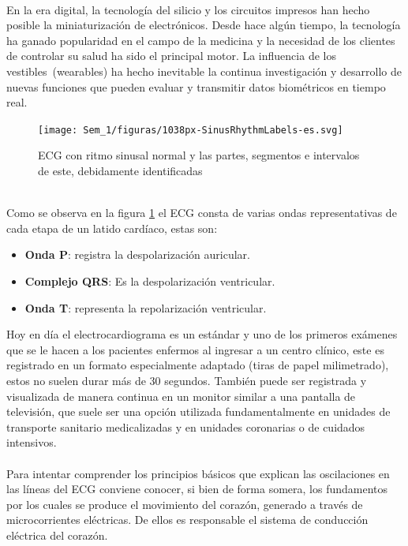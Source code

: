 \documentclass[12pt,letterpaper,oneside,openright]{book}
\begin{document}
    \\
    En la era digital, la tecnología del silicio y los circuitos impresos han hecho posible la miniaturización de electrónicos. Desde hace algún tiempo, la tecnología ha ganado popularidad en el campo de la medicina y la necesidad de los clientes de controlar su salud ha sido el principal motor. La influencia de los \guillemetleft vestibles\guillemetright \ (wearables) ha hecho inevitable la continua investigación y desarrollo de nuevas funciones que pueden evaluar y transmitir datos biométricos en tiempo real. \\ 
    \begin{figure}[h]
    	\centering
    	\texttt{[image: Sem\_1/figuras/1038px-SinusRhythmLabels-es.svg]}
    	\caption{ECG con ritmo sinusal normal y las partes, segmentos e intervalos de este, debidamente identificadas}
    	\label{fig:ECGSinusal}
    \end{figure}
    \\
    
    Como se observa en la figura \ref{fig:ECGSinusal} el ECG consta de varias ondas representativas de cada etapa de un latido cardíaco, estas son: \\	
	\begin{itemize}
		\item \textbf{Onda P}: registra la despolarización auricular.
		\item \textbf{Complejo QRS}: Es la despolarización ventricular.
		\item \textbf{Onda T}: representa la repolarización ventricular.
	\end{itemize}
	
	Hoy en día el electrocardiograma es un estándar y uno de los primeros exámenes que se le hacen a los pacientes enfermos al ingresar a un centro clínico, este es registrado en un formato especialmente adaptado (tiras de papel milimetrado), estos no suelen durar más de 30 segundos. También puede ser registrada y visualizada de manera continua en un monitor similar a una pantalla de televisión, que suele ser una opción utilizada fundamentalmente en unidades de transporte sanitario medicalizadas y en unidades coronarias o de cuidados intensivos. \\
	\\
	Para intentar comprender los principios básicos que explican las oscilaciones en las líneas del ECG conviene conocer, si bien de forma somera, los fundamentos por los cuales se produce el movimiento del corazón, generado a través de microcorrientes eléctricas. De ellos es responsable el sistema de conducción eléctrica del corazón.
	
\end{document}
